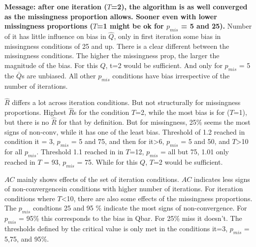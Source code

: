 \documentclass[Royal,times,sageh]{sagej}
\begin{document}
\textbf{Message: after one iteration (\(T\)=2), the algorithm is as well
converged as the missingness proportion allows. Sooner even with lower
missingness proportions (\(T\)=1 might be ok for \(p_{mis}\) = 5 and
25).} Number of it has little influence on bias in \(\hat{Q}\), only in
first iteration some bias in missingness conditions of 25 and up. There
is a clear different between the missingness conditions. The higher the
missingness prop, the larger the magnitude of the bias. For this \(Q\),
t=2 would be sufficient. And only for \(p_{mis}\) = 5 the \(\bar{Q}\)s
are unbiased. All other \(p_{mis}\) conditions have bias irrespective of
the number of iterations.

\(\widehat{R}\) differs a lot across iteration conditions. But not
structurally for missingness proportions. Highest \(\widehat{R}\)s for
the condition \(T\)=2, while the most bias is for (\(T\)=1), but there
is no \(\widehat{R}\) for that by definition. But for missingness, 25\%
seems the most signs of non-conv, while it has one of the least bias.
Threshold of 1.2 reached in condition it = 3, \(p_{mis}\) = 5 and 75,
and then for it\textgreater6, \(p_{mis}\) = 5 and 50, and
\(T\)\textgreater10 for all \(p_{mis}\). Threshold 1.1 reached in in
\(T\)=12, \(p_{mis}\) = all but 75, 1.01 only reached in \(T\) = 93,
\(p_{mis}\) = 75. While for this \(Q\), \(T\)=2 would be sufficient.

\(AC\) mainly shows effects of the set of iteration conditions. \(AC\)
indicates less signs of non-convergencein conditions with higher number
of iterations. For iteration conditions where \(T\)\textless10, there
are also some effects of the missingness proportions. The \(p_{mis}\)
condtions 25 and 95 \% indicate the most signs of non-convergence. For
\(p_{mis}\) = 95\% this corresponds to the bias in Qbar. For 25\% miss
it doesn't. The thresholds defined by the critical value is only met in
the conditions it=3, \(p_{mis}\) = 5,75, and 95\%.
\end{document}
